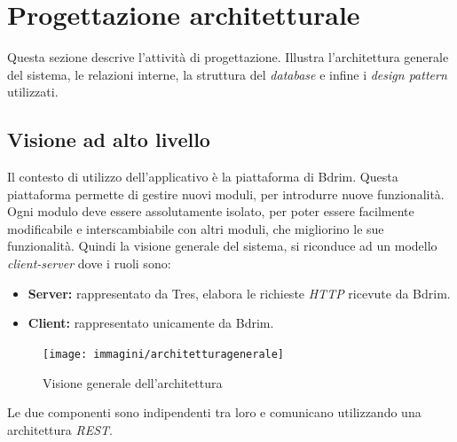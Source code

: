 \newpage
\section{Progettazione architetturale}
Questa sezione descrive l'attività di progettazione. Illustra l'architettura generale del sistema, le relazioni interne, la struttura del \emph{database} e infine i \emph{design pattern} utilizzati.
\subsection{Visione ad alto livello}
Il contesto di utilizzo dell'applicativo è la piattaforma di Bdrim. Questa piattaforma permette di gestire nuovi moduli, per introdurre nuove funzionalità. Ogni modulo deve essere assolutamente isolato, per poter essere facilmente modificabile e interscambiabile con altri moduli, che migliorino le sue funzionalità. Quindi la visione generale del sistema, si riconduce ad un modello \emph{client-server} dove i ruoli sono:
\begin{itemize}
\item \textbf{Server:} rappresentato da Tres, elabora le richieste \emph{HTTP} ricevute da Bdrim.
\item \textbf{Client:} rappresentato unicamente da Bdrim.
\end{itemize}
\begin{figure}[h]
\centering
\texttt{[image: immagini/architetturagenerale]}
\caption{Visione generale dell'architettura}
\label{fig:arch-gen}
\end{figure}
Le due componenti sono indipendenti tra loro e comunicano utilizzando una architettura \emph{REST}.
\newpage
